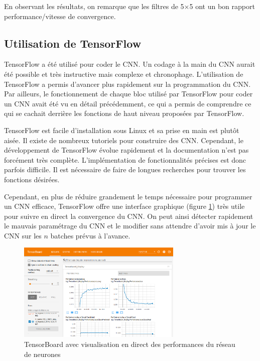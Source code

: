 En observant les résultats, on remarque que les filtres de 5$\times$5 ont un bon rapport performance/vitesse de convergence.


\subsection{Utilisation de TensorFlow}

TensorFlow a été utilisé pour coder le CNN. Un codage à la main du CNN aurait été possible et très instructive mais complexe et chronophage. L'utilisation de TensorFlow a permis d'avancer plus rapidement sur la programmation du CNN. Par ailleurs, le fonctionnement de chaque bloc utilisé par TensorFlow pour coder un CNN avait été vu en détail précédemment, ce qui a permis de comprendre ce qui se cachait derrière les fonctions de haut niveau proposées par TensorFlow.

TensorFlow est facile d'installation sous Linux et sa prise en main est plutôt aisée. Il existe de nombreux tutoriels pour construire des CNN. Cependant, le développement de TensorFlow évolue rapidement et la documentation n'est pas forcément très complète. L'implémentation de fonctionnalités précises est donc parfois difficile. Il est nécessaire de faire de longues recherches pour trouver les fonctions désirées.

Cependant, en plus de réduire grandement le temps nécessaire pour programmer un CNN efficace, TensorFlow offre une interface graphique (figure \ref{fig:interface_TF}) très utile pour suivre en direct la convergence du CNN. On peut ainsi détecter rapidement le mauvais paramétrage du CNN et le modifier sans attendre d'avoir mis à jour le CNN sur les $n$ batches prévus à l'avance.

\begin{figure}[h]
 \centering
 \includegraphics[width=0.7\textwidth]{img/interface_TF.png}
 \caption{TensorBoard avec visualisation en direct des performances du réseau de neurones}
 \label{fig:interface_TF}
\end{figure}


